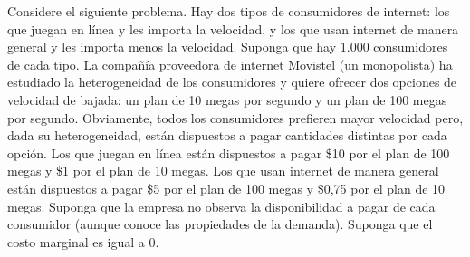 \question Considere el siguiente problema. Hay dos tipos de consumidores de internet: los que juegan en línea y les importa la velocidad, y los que usan internet de manera general y les importa menos la velocidad. Suponga que hay 1.000 consumidores de cada tipo. La compañía proveedora de internet Movistel (un monopolista) ha estudiado la heterogeneidad de los consumidores y quiere ofrecer dos opciones de velocidad de bajada: un plan de 10 megas por segundo y un plan de 100 megas por segundo. Obviamente, todos los consumidores prefieren mayor velocidad pero, dada su heterogeneidad, están dispuestos a pagar cantidades distintas por cada opción. Los que juegan en línea están dispuestos a pagar \$10 por el plan de 100 megas y \$1 por el plan de 10 megas. Los que usan internet de manera general están dispuestos a pagar \$5 por el plan de 100 megas y \$0,75 por el plan de 10 megas. Suponga que la empresa no observa la disponibilidad a pagar de cada consumidor (aunque conoce las propiedades de la demanda). Suponga que el costo marginal es igual a 0.
